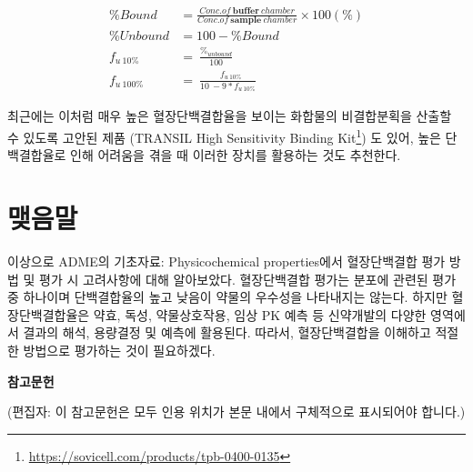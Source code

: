 \documentclass[
  11pt,
  krantz2, a4paper, twoside]{krantz}
\begin{document}
\begin{equation}
\begin{split}
\% Bound &= \frac{Conc.of\ \mathbf{buffer}\ chamber}{Conc.of\ \mathbf{sample}\ chamber} \times 100(\%) \\
\% Unbound &= 100 - \% Bound \\
f_{u\ 10\%} &= \ \frac{\%_{unbound}}{100} \\ 
f_{u\ 100\%} &= \ \frac{{\ \ \ f}_{u\ 10\%}}{10\  - 9*f_{u\ 10\%}}
\end{split}
\label{eq:eq03-03} 
\end{equation}

최근에는 이처럼 매우 높은 혈장단백결합율을 보이는 화합물의 비결합분획을 산출할 수 있도록 고안된 제품 (TRANSIL High Sensitivity Binding Kit\footnote{\url{https://sovicell.com/products/tpb-0400-0135}}) 도 있어, 높은 단백결합율로 인해 어려움을 겪을 때 이러한 장치를 활용하는 것도 추천한다.

\hypertarget{uxb9fauxc74cuxb9d0-2}{%
\section{맺음말}\label{uxb9fauxc74cuxb9d0-2}}

이상으로 ADME의 기초자료: Physicochemical properties에서 혈장단백결합 평가 방법 및 평가 시 고려사항에 대해 알아보았다. 혈장단백결합 평가는 분포에 관련된 평가 중 하나이며 단백결합율의 높고 낮음이 약물의 우수성을 나타내지는 않는다. 하지만 혈장단백결합율은 약효, 독성, 약물상호작용, 임상 PK 예측 등 신약개발의 다양한 영역에서 결과의 해석, 용량결정 및 예측에 활용된다. 따라서, 혈장단백결합을 이해하고 적절한 방법으로 평가하는 것이 필요하겠다.

\textbf{참고문헌}

(편집자: 이 참고문헌은 모두 인용 위치가 본문 내에서 구체적으로 표시되어야 합니다.)
\end{document}

